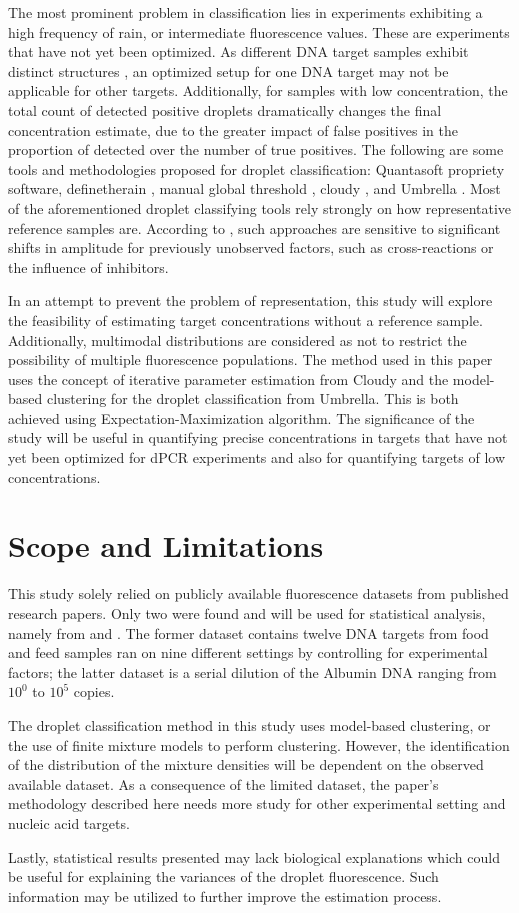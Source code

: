 The most prominent problem in classification lies in experiments exhibiting a high frequency of rain, or intermediate fluorescence values. These are experiments that have not yet been optimized. As different DNA target samples exhibit distinct structures \cite{Lievens2016}, an optimized setup for one DNA target may not be applicable for other targets. Additionally, for samples with low concentration, the total count of detected positive droplets dramatically changes the final concentration estimate, due to the greater impact of false positives in the proportion of detected over the number of true positives. The following are some tools and methodologies proposed for droplet classification: Quantasoft propriety software, definetherain \cite{Jones2014}, manual global threshold \cite{Dreo2014}, cloudy \cite{Lievens2016}, and Umbrella \cite{Jacobs2017}. Most of the aforementioned droplet classifying tools rely strongly on how representative reference samples are. According to , such approaches are sensitive to significant shifts in amplitude for previously unobserved factors, such as cross-reactions or the influence of inhibitors.

In an attempt to prevent the problem of representation, this study will explore the feasibility of estimating target concentrations without a reference sample. Additionally, multimodal distributions are considered as not to restrict the possibility of multiple fluorescence populations. The method used in this paper uses the concept of iterative parameter estimation from Cloudy and the model-based clustering for the droplet classification from Umbrella. This is both achieved using Expectation-Maximization algorithm. The significance of the study will be useful in quantifying precise concentrations in targets that have not yet been optimized for dPCR experiments and also for quantifying targets of low concentrations. 

\section{Scope and Limitations}
\label{sec:significance}
This study solely relied on publicly available fluorescence datasets from published research papers. Only two were found and will be used for statistical analysis, namely from  and . The former dataset contains twelve DNA targets from food and feed samples ran on nine different settings by controlling for experimental factors; the latter dataset is a serial dilution of the Albumin DNA ranging from \(10^0\) to \(10^5\) copies. 

The droplet classification method in this study uses model-based clustering, or the use of finite mixture models to perform clustering. However, the identification of the distribution of the mixture densities will be dependent on the observed available dataset. As a consequence of the limited dataset, the paper's methodology described here needs more study for other experimental setting and nucleic acid targets.

Lastly, statistical results presented may lack biological explanations which could be useful for explaining the variances of the droplet fluorescence. Such information may be utilized to further improve the estimation process.